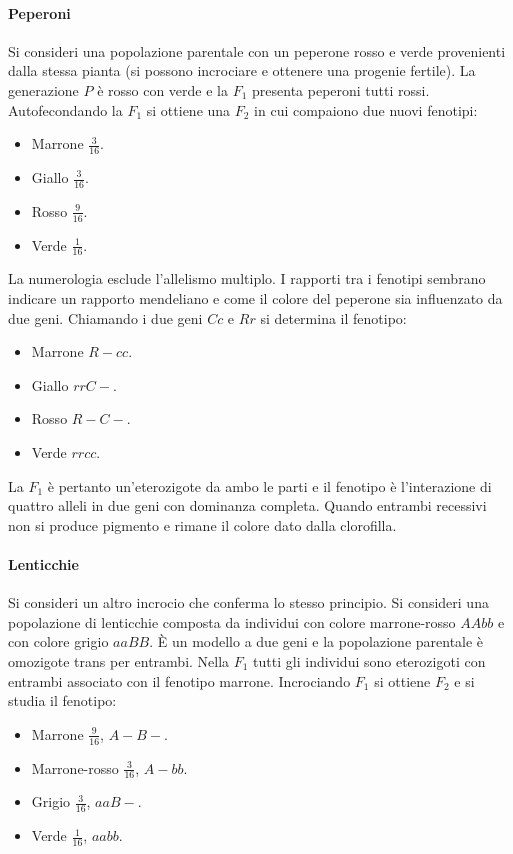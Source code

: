 \paragraph{Peperoni}
Si consideri una popolazione parentale con un peperone rosso e verde provenienti dalla stessa pianta (si possono incrociare e ottenere una progenie fertile). La generazione $P$ \`e 
rosso con verde e la $F_1$ presenta peperoni tutti rossi. Autofecondando la $F_1$ si ottiene una $F_2$ in cui compaiono due nuovi fenotipi:
\begin{itemize}
	\item Marrone $\frac{3}{16}$.
	\item Giallo $\frac{3}{16}$.
	\item Rosso $\frac{9}{16}$.
	\item Verde $\frac{1}{16}$.
\end{itemize}
La numerologia esclude l'allelismo multiplo. I rapporti tra i fenotipi sembrano indicare un rapporto mendeliano e come il colore del peperone sia influenzato da due geni. Chiamando i due
geni $Cc$ e $Rr$ si determina il
fenotipo:
\begin{itemize}
	\item Marrone $R-cc$.
	\item Giallo $rrC-$.
	\item Rosso $R-C-$.
	\item Verde $rrcc$.
\end{itemize}
La $F_1$ \`e pertanto un'eterozigote da ambo le parti e il fenotipo \`e l'interazione di quattro alleli in due geni con dominanza completa. Quando entrambi recessivi non si produce
pigmento e rimane il colore dato dalla clorofilla.
\paragraph{Lenticchie}
Si consideri un altro incrocio che conferma lo stesso principio. Si consideri una popolazione di lenticchie composta da individui con colore marrone-rosso $AAbb$ e con colore grigio 
$aaBB$. \`E un modello a due geni e la popolazione parentale \`e omozigote trans per entrambi. Nella $F_1$ tutti gli individui sono eterozigoti con entrambi associato con il fenotipo 
marrone. Incrociando $F_1$ si ottiene $F_2$ e si studia il fenotipo:
\begin{itemize}
	\item Marrone $\frac{9}{16}$, $A-B-$.
	\item Marrone-rosso $\frac{3}{16}$, $A-bb$.
	\item Grigio $\frac{3}{16}$, $aaB-$.
	\item Verde $\frac{1}{16}$, $aabb$.
\end{itemize}
